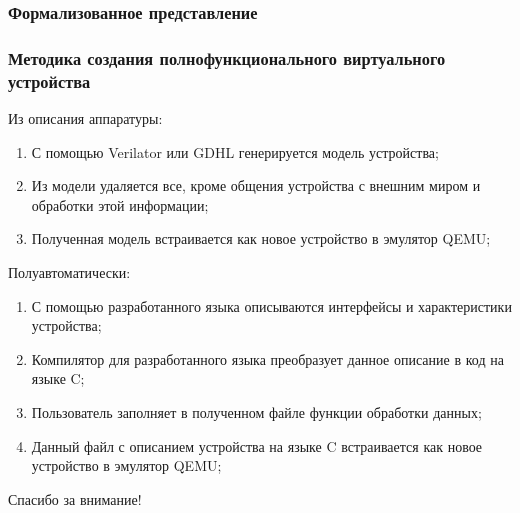 \begin{frame}%
    \frametitle{Формализованное представление}
\end{frame}


\begin{frame}%
    \frametitle{Методика создания полнофункционального виртуального устройства}
    Из описания аппаратуры:
    \begin{enumerate}
        \item С помощью Verilator или GDHL генерируется модель устройства;
        \item Из модели удаляется все, кроме общения устройства с внешним миром и обработки этой информации;
        \item Полученная модель встраивается как новое устройство в эмулятор QEMU;
    \end{enumerate}
    Полуавтоматически:
    \begin{enumerate}
        \item С помощью разработанного языка описываются интерфейсы и характеристики устройства;
        \item Компилятор для разработанного языка преобразует данное описание в код на языке C;
        \item Пользователь заполняет в полученном файле функции обработки данных;
        \item Данный файл с описанием устройства на языке C встраивается как новое устройство в эмулятор QEMU;
    \end{enumerate}
\end{frame}


\begin{frame}%
    \begin{center}
        \Huge Спасибо за внимание!
    \end{center}
\end{frame}
